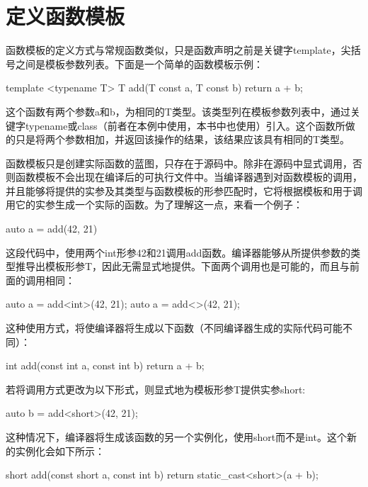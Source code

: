 \section{定义函数模板}
函数模板的定义方式与常规函数类似，只是函数声明之前是关键字template，尖括号之间是模板参数列表。下面是一个简单的函数模板示例：

\begin{cpp}
template <typename T>
T add(T const a, T const b)
{
	return a + b;
}
\end{cpp}

这个函数有两个参数a和b，为相同的T类型。该类型列在模板参数列表中，通过关键字typename或class（前者在本例中使用，本书中也使用）引入。这个函数所做的只是将两个参数相加，并返回该操作的结果，该结果应该具有相同的T类型。

函数模板只是创建实际函数的蓝图，只存在于源码中。除非在源码中显式调用，否则函数模板不会出现在编译后的可执行文件中。当编译器遇到对函数模板的调用，并且能够将提供的实参及其类型与函数模板的形参匹配时，它将根据模板和用于调用它的实参生成一个实际的函数。为了理解这一点，来看一个例子：

\begin{cpp}
auto a = add(42, 21)
\end{cpp}

这段代码中，使用两个int形参42和21调用add函数。编译器能够从所提供参数的类型推导出模板形参T，因此无需显式地提供。下面两个调用也是可能的，而且与前面的调用相同：

\begin{cpp}
auto a = add<int>(42, 21);
auto a = add<>(42, 21);
\end{cpp}

这种使用方式，将使编译器将生成以下函数（不同编译器生成的实际代码可能不同）：

\begin{cpp}
int add(const int a, const int b)
{
	return a + b;
}
\end{cpp}

若将调用方式更改为以下形式，则显式地为模板形参T提供实参short:

\begin{cpp}
auto b = add<short>(42, 21);
\end{cpp}

这种情况下，编译器将生成该函数的另一个实例化，使用short而不是int。这个新的实例化会如下所示：

\begin{cpp}
short add(const short a, const int b)
{
	return static_cast<short>(a + b);
}
\end{cpp}

